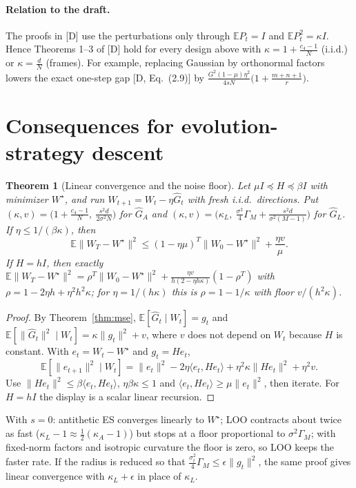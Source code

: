 \documentclass[11pt]{article}
\newtheorem{theorem}{Theorem}
\theoremstyle{remark}
\newcommand{\E}{\mathbb{E}}
\newcommand{\ip}[2]{\langle #1,#2\rangle}
\newcommand{\Gh}{\widehat G}
\begin{document}
\paragraph{Relation to the draft.} The proofs in [D] use the perturbations only through $\E P_t=I$ and $\E P_t^2=\kappa I$. Hence Theorems 1--3 of [D] hold for every design above with $\kappa=1+\frac{c_4-1}N$ (i.i.d.) or $\kappa=\frac dN$ (frames). For example, replacing Gaussian by orthonormal factors lowers the exact one-step gap [D, Eq.~(2.9)] by $\frac{G^2(1-\mu)\eta^2}{4sN}\big(1+\frac{m+n+1}{r}\big)$.

\section{Consequences for evolution-strategy descent}
\begin{theorem}[Linear convergence and the noise floor]\label{thm:descent}
Let $\mu I\preceq H\preceq\beta I$ with minimizer $W^\star$, and run $W_{t+1}=W_t-\eta\Gh_t$ with fresh i.i.d.\ directions. Put $(\kappa,v)=\big(1+\frac{c_4-1}N,\ \frac{s^2d}{2\sigma^2N}\big)$ for $\Gh_A$ and $(\kappa,v)=\big(\kappa_L,\ \frac{\sigma^2}4\Gamma_M+\frac{s^2d}{\sigma^2(M-1)}\big)$ for $\Gh_L$. If $\eta\le1/(\beta\kappa)$, then
\[
\E\|W_T-W^\star\|^2\le(1-\eta\mu)^T\|W_0-W^\star\|^2+\frac{\eta v}{\mu}.
\]
If $H=hI$, then exactly $\E\|W_T-W^\star\|^2=\rho^T\|W_0-W^\star\|^2+\frac{\eta v}{h(2-\eta h\kappa)}(1-\rho^T)$ with $\rho=1-2\eta h+\eta^2h^2\kappa$; for $\eta=1/(h\kappa)$ this is $\rho=1-1/\kappa$ with floor $v/(h^2\kappa)$.
\end{theorem}
\begin{proof}
By Theorem~\ref{thm:mse}, $\E[\Gh_t\mid W_t]=g_t$ and $\E[\|\Gh_t\|^2\mid W_t]=\kappa\|g_t\|^2+v$, where $v$ does not depend on $W_t$ because $H$ is constant. With $e_t=W_t-W^\star$ and $g_t=He_t$,
\[
\E[\|e_{t+1}\|^2\mid W_t]=\|e_t\|^2-2\eta\ip{e_t}{He_t}+\eta^2\kappa\|He_t\|^2+\eta^2v .
\]
Use $\|He_t\|^2\le\beta\ip{e_t}{He_t}$, $\eta\beta\kappa\le1$ and $\ip{e_t}{He_t}\ge\mu\|e_t\|^2$, then iterate. For $H=hI$ the display is a scalar linear recursion.
\end{proof}
With $s=0$: antithetic ES converges linearly to $W^\star$; LOO contracts about twice as fast ($\kappa_L-1\approx\frac12(\kappa_A-1)$) but stops at a floor proportional to $\sigma^2\Gamma_M$; with fixed-norm factors and isotropic curvature the floor is zero, so LOO keeps the faster rate. If the radius is reduced so that $\frac{\sigma_t^2}{4}\Gamma_M\le\epsilon\|g_t\|^2$, the same proof gives linear convergence with $\kappa_L+\epsilon$ in place of $\kappa_L$.
\end{document}
